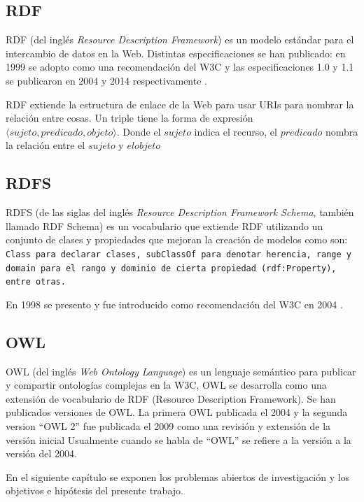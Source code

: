 \subsection{RDF}\label{sw:rdf}
RDF (del inglés \emph{Resource Description Framework}) es un modelo estándar para el intercambio de datos en la Web. 
Distintas especificaciones se han publicado: en 1999 se adopto como una recomendación del W3C y las especificaciones 1.0 y 1.1 se publicaron en 2004 y 2014 respectivamente \cite{bikakis2013semantic}.

RDF extiende la estructura de enlace de la Web para usar URIs para nombrar la relación entre cosas. Un triple tiene la forma de expresión  $\langle sujeto, predicado, objeto \rangle$. Donde el $sujeto$ indica el recurso, el $predicado$ nombra la relación entre el $sujeto$ y $el objeto$

\subsection{RDFS}
RDFS (de las siglas del inglés \emph{Resource Description Framework Schema},
también llamado RDF Schema) es un vocabulario que extiende RDF utilizando un
conjunto de clases y propiedades que mejoran la creación de modelos como son:
\tt{Class} para declarar clases, \tt{subClassOf} para denotar herencia,
\tt{range} y \tt{domain} para el rango y dominio de cierta propiedad
(\tt{rdf:Property}), entre otras.

En 1998 se presento y fue introducido como recomendación del W3C en 2004
\cite{bikakis2013semantic}.

\subsection{OWL}

OWL (del inglés \emph{Web Ontology Language}) es un lenguaje semántico para publicar y compartir ontologías complejas en la W3C, OWL se desarrolla como una extensión de vocabulario de RDF (Resource Description Framework). 
Se han publicados versiones de OWL. La primera OWL publicada el 2004 y la segunda version ``OWL 2'' fue publicada el 2009 como una revisión y extensión de la versión inicial Usualmente cuando se habla de ``OWL'' se refiere a la versión a la versión del 2004.


En el siguiente capítulo se exponen los problemas abiertos de investigación y los objetivos e hipótesis del presente trabajo.
